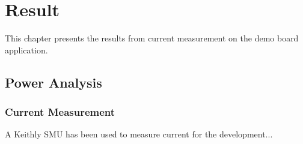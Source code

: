 \chapter{Result}

This chapter presents the results from current measurement on the demo board application. 

\section{Power Analysis}

\subsection{Current Measurement}

A Keithly SMU has been used to measure current for the development...